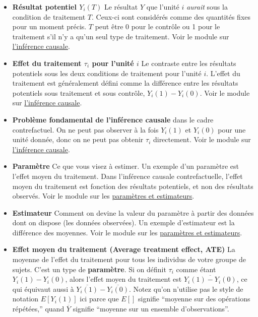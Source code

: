 \documentclass[12pt,]{book}
\begin{document}
\begin{itemize}
\item
  \textbf{Résultat potentiel \(Y_i(T)\)} Le résultat \(Y\) que l'unité \(i\) \emph{aurait} sous la condition de traitement \(T\). Ceux-ci sont considérés comme des quantités fixes pour un moment précis.
  \(T\) peut être 0 pour le contrôle ou 1 pour le traitement s'il n'y a qu'un seul type de traitement. Voir le module sur \href{inférence-causale.html}{l'inférence causale}.
\item
  \textbf{Effet du traitement \(\tau_i\) pour l'unité \(i\)} Le contraste entre les résultats potentiels sous les deux conditions de traitement pour l'unité \(i\).
  L'effet du traitement est généralement défini comme la différence entre les résultats potentiels sous traitement et sous contrôle, \(Y_i(1)-Y_i(0)\).
  Voir le module sur \href{inférence-causale.html}{l'inférence causale}.
\item
  \textbf{Problème fondamental de l'inférence causale} dans le cadre contrefactuel. On ne peut pas observer à la fois \(Y_i(1)\) et \(Y_i(0)\) pour une unité donnée, donc on ne peut pas obtenir \(\tau_i\) directement.
  Voir le module sur \href{inférence-causale.html}{l'inférence causale}.
\item
  \textbf{Paramètre} Ce que vous visez à estimer. Un exemple d'un paramètre est l'effet moyen du traitement.
  Dans l'inférence causale contrefactuelle, l'effet moyen du traitement est fonction des résultats potentiels, et non des résultats observés.
  Voir le module sur les \href{paramètres-et-estimateurs.html}{paramètres et estimateurs}.
\item
  \textbf{Estimateur} Comment on devine la valeur du paramètre à partir des données dont on dispose (les données observées).
  Un exemple d'estimateur est la différence des moyennes. Voir le module sur les \href{paramètres-et-estimateurs.html}{paramètres et estimateurs}.
\item
  \textbf{Effet moyen du traitement (Average treatment effect, ATE)} La moyenne de l'effet du traitement pour tous les individus de votre groupe de sujets.
  C'est un type de \textbf{paramètre}. Si on définit \(\tau_i\) comme étant \(Y_i(1)-Y_i(0)\), alors l'effet moyen du traitement est \(\overline{Y_i(1)-Y_i(0)}\), ce qui équivaut aussi à \(\overline{{Y}_i(1)}-\overline{{Y}_i(0)}\).
  Notez qu'on n'utilise pas le style de notation \(E[Y_i (1)]\) ici parce que \(E[]\) signifie ``moyenne sur des opérations répétées,'' quand \(\overline{Y}\) signifie ``moyenne sur un ensemble d'observations''.

\end{itemize}
\end{document}
